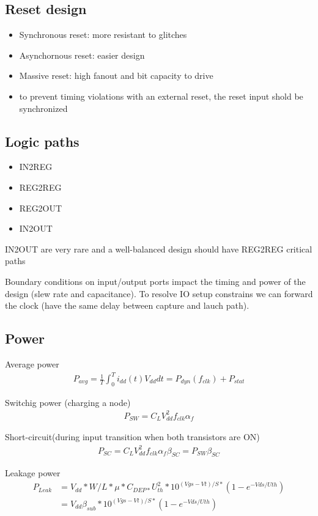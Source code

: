 \subsection{Reset design}
\begin{itemize}
  \item Synchronous reset: more resistant to glitches
  \item Asynchornous reset: easier design
  \item Massive reset: high fanout and bit capacity to drive
  \item to prevent timing violations with an external reset, the reset input shold be synchronized
\end{itemize}

\subsection{Logic paths}
\begin{itemize}
  \item IN2REG
  \item REG2REG
  \item REG2OUT
  \item IN2OUT
\end{itemize}
IN2OUT are very rare and a well-balanced design should have REG2REG critical paths

\bigbreak
Boundary conditions on input/output ports impact the timing and power of the design (slew rate and capacitance). To resolve IO setup constrains we can forward the clock (have the same delay between capture and lauch path).


\subsection{Power}
Average power
\begin{align}
P_{avg} = \frac{1}{T} \int_0^T i_{dd}(t) V_{dd}dt = P_{dyn}(f_{clk}) + P_{stat}
\end{align}

Switchig power (charging a node)
\begin{align}
 P_{SW} = C_L V^2_{dd} f_{clk} \alpha_f
\end{align}

Short-circuit(during input transition when both transistors are ON)
\begin{align}
  P_{SC} = C_L V^2_{dd} f_{clk} \alpha_f \beta_{SC} = P_{SW} \beta_{SC} 
\end{align}

Leakage power
\begin{align}
  P_{Leak} &= V_{dd} * W/L *\mu * C_{DEP*} U_{th}^2* 10^{(Vgs-Vt)/S *} (1 -e ^{-Vds/Uth})\\
           &= V_{dd} \beta_{sub} * 10^{(Vgs-Vt)/S *} (1 -e ^{-Vds/Uth})
\end{align}


